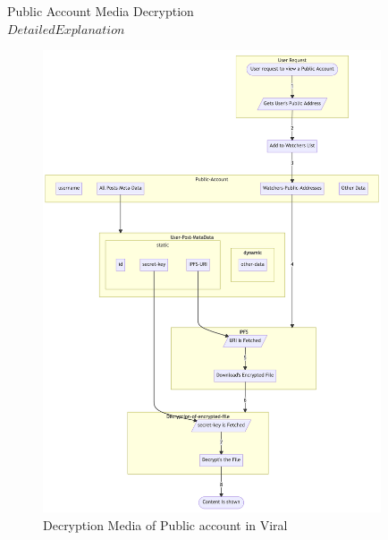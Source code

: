 \documentclass[10pt]{article}
\begin{document}

Public Account Media Decryption\\

$Detailed Explanation$\\

\begin{figure}[H]
\begin{center}
\includegraphics[width=10cm]{decryption-public}
\caption{Decryption Media of Public account in Viral}
\end{center}
\end{figure}
\end{document}
